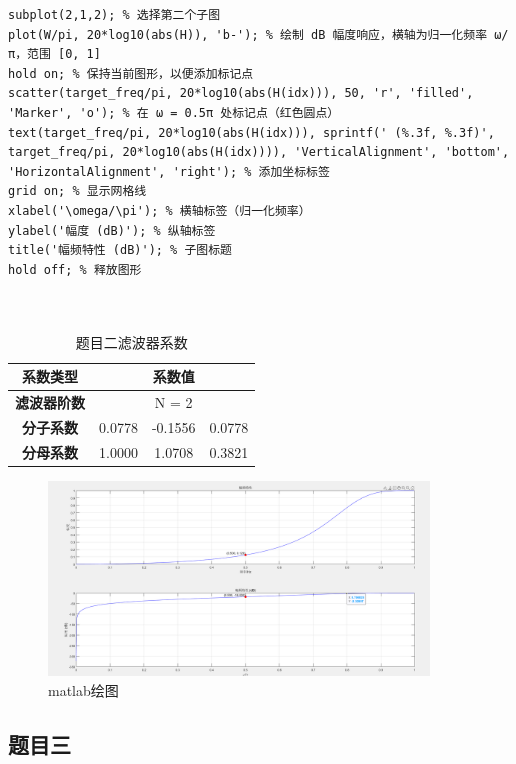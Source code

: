 \documentclass[12pt,hyperref,a4paper,UTF8]{ctexart}
\begin{document}
\begin{lstlisting}[style=matlab, caption={ MATLAB实现代码}]
subplot(2,1,2); % 选择第二个子图
plot(W/pi, 20*log10(abs(H)), 'b-'); % 绘制 dB 幅度响应，横轴为归一化频率 ω/π，范围 [0, 1]
hold on; % 保持当前图形，以便添加标记点
scatter(target_freq/pi, 20*log10(abs(H(idx))), 50, 'r', 'filled', 'Marker', 'o'); % 在 ω = 0.5π 处标记点（红色圆点）
text(target_freq/pi, 20*log10(abs(H(idx))), sprintf(' (%.3f, %.3f)', target_freq/pi, 20*log10(abs(H(idx)))), 'VerticalAlignment', 'bottom', 'HorizontalAlignment', 'right'); % 添加坐标标签
grid on; % 显示网格线
xlabel('\omega/\pi'); % 横轴标签（归一化频率）
ylabel('幅度 (dB)'); % 纵轴标签
title('幅频特性 (dB)'); % 子图标题
hold off; % 释放图形



\end{lstlisting}

\begin{table}[H]
\centering
\caption{题目二滤波器系数}
\label{tab:filter_coef2}
\begin{tabular}{|c|c|c|c|}
\hline
\textbf{系数类型} & \multicolumn{3}{c|}{\textbf{系数值}} \\
\hline
\textbf{滤波器阶数} & \multicolumn{3}{c|}{N = 2} \\
\hline
\textbf{分子系数} & 0.0778 & -0.1556 & 0.0778 \\
\hline
\textbf{分母系数} & 1.0000 & 1.0708 & 0.3821 \\
\hline
\end{tabular}
\end{table}

\begin{figure}[H] %
        \centering
        \includegraphics[width=0.9\textwidth]{figures/302.png} %
        \caption{matlab绘图} %
        \label{fig:example} %
\end{figure}

\subsection{题目三}
\end{document}
